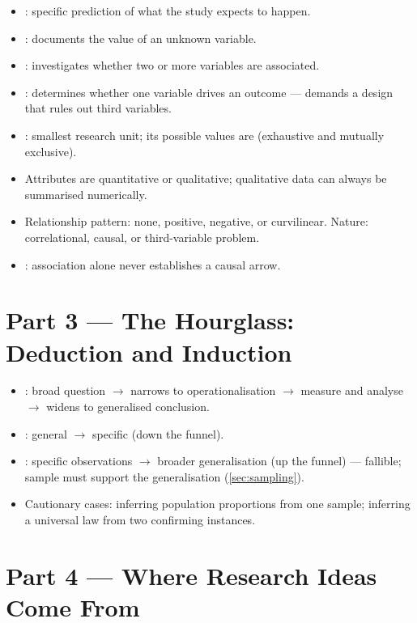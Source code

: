 \documentclass[../main.tex]{subfiles}
\begin{document}
\begin{itemize}
  \item {}: specific prediction of what the study expects to happen.
  \item {}: documents the value of an unknown variable.
  \item {}: investigates whether two or more variables are associated.
  \item {}: determines whether one variable drives an outcome — demands a design that rules out third variables.
  \item {}: smallest research unit; its possible values are  (exhaustive and mutually exclusive).
  \item Attributes are quantitative or qualitative; qualitative data can always be summarised numerically.
  \item Relationship pattern: none, positive, negative, or curvilinear. Nature: correlational, causal, or third-variable problem.
  \item {}: association alone never establishes a causal arrow.
\end{itemize}

\section{Part 3 — The Hourglass: Deduction and Induction}
\label{sec:hourglass}

\begin{itemize}
  \item {}: broad question $\to$ narrows to operationalisation $\to$ measure and analyse $\to$ widens to generalised conclusion.
  \item {}: general $\to$ specific (down the funnel).
  \item {}: specific observations $\to$ broader generalisation (up the funnel) — fallible; sample must support the generalisation (\autoref{sec:sampling}).
  \item Cautionary cases: inferring population proportions from one sample; inferring a universal law from two confirming instances.
\end{itemize}

\section{Part 4 — Where Research Ideas Come From}
\label{sec:research-ideas}
\end{document}

